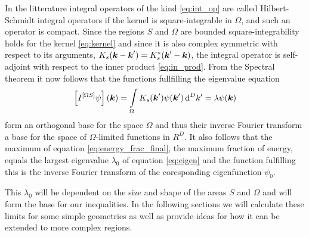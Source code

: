 \documentclass[11pt,a4paper, 
swedish,english %
]{article}
\begin{document}
 In the litterature integral operators of the kind \eqref{eq:int_op} are called Hilbert-Schmidt integral operators if the kernel is square-integrable in $\Omega$, and such an operator is compact. Since the regions $S$ and $\Omega$ are bounded square-integrability holds for the kernel \eqref{eq:kernel} and since it is also complex symmetric with respect to its arguments, $K_s(\vb*k-\vb*k')=K_s^*(\vb*k'-\vb*k)$, the integral operator is self-adjoint with respect to the inner product \eqref{eq:in_prod}. From the Spectral theorem it now follows that the functions fullfilling the eigenvalue equation
\begin{equation}
  \label{eq:eigen}
\qty[I^{[\Omega S]}\psi](\vb*k)=\int_\Omega K_s(\vb*k')\psi(\vb*k') \id^Dk'=\lambda \psi(\vb*k)
\end{equation}
form an orthogonal base for the space $\Omega$ and thus their inverse Fourier transform a base for the space of $\Omega$-limited functions in $R^D$. It also follows that the maximum of equation \eqref{eq:energy_frac_final}, the maximum fraction of energy, equals the largest eigenvalue $\lambda_0$ of equation \eqref{eq:eigen} and the function fulfilling this is the inverse Fourier transform of the coresponding eigenfunction $\psi_0$.

This $\lambda_0$ will be dependent on the size and shape of the areas $S$ and $\Omega$ and will form the base for our inequalities. In the following sections we will calculate these limits for some simple geometries as well as provide ideas for how it can be extended to more complex regions.
\end{document}
